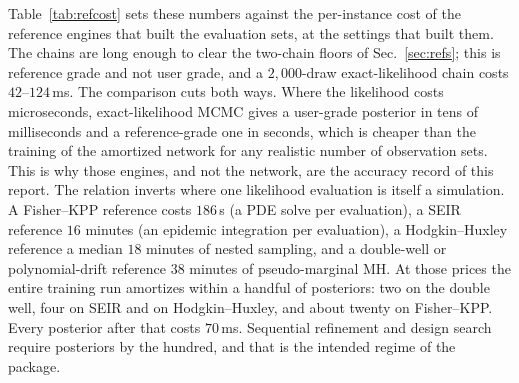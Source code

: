 \documentclass[10pt]{article}
\begin{document}
Table~\ref{tab:refcost} sets these numbers against the per-instance cost of the reference engines that
built the evaluation sets, at the settings that built them. The chains are long enough to clear the
two-chain floors of Sec.~\ref{sec:refs}; this is reference grade and not user grade, and a
$2{,}000$-draw exact-likelihood chain costs $42$--$124$\,ms. The comparison cuts both ways. Where the
likelihood costs microseconds, exact-likelihood MCMC gives a user-grade posterior in tens of
milliseconds and a reference-grade one in seconds, which is cheaper than the training of the
amortized network for any realistic number of observation sets. This is why those engines, and not
the network, are the accuracy record of this report. The relation inverts where one likelihood
evaluation is itself a simulation. A Fisher--KPP reference costs $186$\,s (a PDE solve per
evaluation), a SEIR reference $16$ minutes (an epidemic integration per evaluation), a
Hodgkin--Huxley reference a median $18$ minutes of nested sampling, and a double-well or
polynomial-drift reference $38$ minutes of pseudo-marginal MH. At those prices the entire training
run amortizes within a handful of posteriors: two on the double well, four on SEIR and on
Hodgkin--Huxley, and about twenty on Fisher--KPP. Every posterior after that costs $70$\,ms.
Sequential refinement and design search require posteriors by the hundred, and that is the intended
regime of the package.
\end{document}
